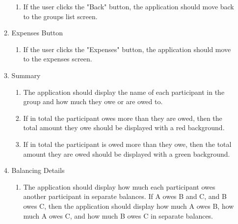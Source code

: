 \documentclass[conference]{IEEEtran}
\begin{document}
\begin{enumerate}
\begin{enumerate}
\begin{enumerate}
                        \item If the user clicks the "Back" button, the application should move back to the groups list screen.
                    \end{enumerate}
                \item Expenses Button
                    \begin{enumerate}
                        \item If the user clicks the "Expenses" button, the application should move to the expenses screen.
                    \end{enumerate}
                \item Summary
                    \begin{enumerate}
                        \item The application should display the name of each participant in the group and how much they owe or are owed to.
                        \item If in total the participant owes more than they are owed, then the total amount they owe should be displayed with a red background.
                        \item If in total the participant is owed more than they owe, then the total amount they are owed should be displayed with a green background.
                    \end{enumerate}
                \item Balancing Details
                    \begin{enumerate}
                        \item The application should display how much each participant owes another participant in separate balances. If A owes B and C, and B owes C, then the application should display how much A owes B, how much A owes C, and how much B owes C in separate balances.
                    \end{enumerate}
            \end{enumerate}
    \end{enumerate}
\end{document}
